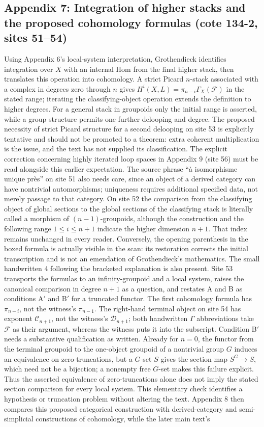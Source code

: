 \subsection*{Appendix 7: Integration of higher stacks and the proposed cohomology formulas (cote 134-2, sites 51--54)}
Using Appendix 6's local-system interpretation, Grothendieck identifies integration over $X$ with an internal Hom from the final higher stack, then translates this operation into cohomology. A strict Picard $n$-stack associated with a complex in degrees zero through $n$ gives $H^i(X,L)=\pi_{n-i}\Gamma_X(\mathcal F)$ in the stated range; iterating the classifying-object operation extends the definition to higher degrees. For a general stack in groupoids only the initial range is asserted, while a group structure permits one further delooping and degree. The proposed necessity of strict Picard structure for a second delooping on site 53 is explicitly tentative and should not be promoted to a theorem: extra coherent multiplication is the issue, and the text has not supplied its classification. The explicit correction concerning highly iterated loop spaces in Appendix 9 (site 56) must be read alongside this earlier expectation. The source phrase ``à isomorphisme unique près'' on site 51 also needs care, since an object of a derived category can have nontrivial automorphisms; uniqueness requires additional specified data, not merely passage to that category. On site 52 the comparison from the classifying object of global sections to the global sections of the classifying stack is literally called a morphism of $(n-1)$-groupoids, although the construction and the following range $1\leq i\leq n+1$ indicate the higher dimension $n+1$. That index remains unchanged in every reader. Conversely, the opening parenthesis in the boxed formula is actually visible in the scan: its restoration corrects the initial transcription and is not an emendation of Grothendieck's mathematics. The small handwritten 4 following the bracketed explanation is also present. Site 53 transports the formulas to an infinity-groupoid and a local system, raises the canonical comparison in degree $n+1$ as a question, and restates A and B as conditions A$'$ and B$'$ for a truncated functor. The first cohomology formula has $\pi_{n-i}$, not the witness's $\pi_{n-1}$. The right-hand terminal object on site 54 has exponent $\mathcal C_{n+1}$, not the witness's $\mathcal D_{n+1}$; both handwritten $\Gamma$ abbreviations take $\mathcal F$ as their argument, whereas the witness puts it into the subscript. Condition B$'$ needs a substantive qualification as written. Already for $n=0$, the functor from the terminal groupoid to the one-object groupoid of a nontrivial group $G$ induces an equivalence on zero-truncations, but a $G$-set $S$ gives the section map $S^G\to S$, which need not be a bijection; a nonempty free $G$-set makes this failure explicit. Thus the asserted equivalence of zero-truncations alone does not imply the stated section comparison for every local system. This elementary check identifies a hypothesis or truncation problem without altering the text. Appendix 8 then compares this proposed categorical construction with derived-category and semi-simplicial constructions of cohomology, while the later main text's 